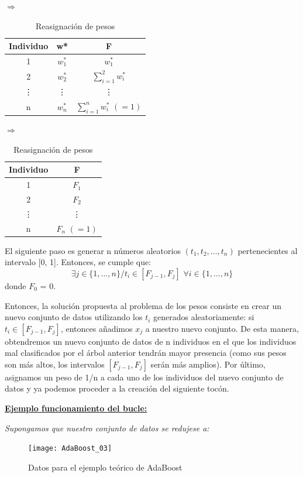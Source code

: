\documentclass[12pt,twoside]{article}
\begin{document}
\begin{table}[h]
\centering
$\Rightarrow$
\begin{tabular}{|c|c|c|}
\hline
Individuo & w* & F\\ \hline
1 & $w_1^*$ & $w_1^*$ \\ \hline
2 & $w_2^*$ & $\displaystyle \sum_{i=1}^2 w_i^*$ \\ \hline
\vdots & \vdots & \vdots \\ \hline
n & $w_n^*$ & $\displaystyle \sum_{i=1}^n w_i^* \, \, (= 1)$ \\ \hline
\end{tabular}
$\Rightarrow$
\begin{tabular}{|c|c|}
\hline
Individuo & F \\ \hline
1 & $F_1$ \\ \hline
2 & $F_2$ \\ \hline
\vdots & \vdots \\ \hline
n & $F_n \, \, (=1)$ \\ \hline
\end{tabular}
\caption{Reasignación de pesos}
\label{tab:AdaB_pesos}
\end{table}

El siguiente paso es generar n números aleatorios $(t_1, t_2, \dots, t_n)$ pertenecientes al intervalo [0, 1]. Entonces, se cumple que:
\begin{equation*}
\exists j \in \{1, \dots, n \} /t_i \in [F_{j-1}, F_{j}] \, \, \forall i \in \{1, \dots, n \}
\end{equation*}
donde $F_0$ = 0.

Entonces, la solución propuesta al problema de los pesos consiste en crear un nuevo conjunto de datos utilizando los $t_i$ generados aleatoriamente: si $t_i \in [F_{j-1}, F_{j}]$, entonces añadimos $x_j$ a nuestro nuevo conjunto. De esta manera, obtendremos un nuevo conjunto de datos de n individuos en el que los individuos mal clasificados por el árbol anterior tendrán mayor presencia (como sus pesos son más altos, los intervalos $[F_{j-1}, F_{j}]$ serán más amplios). Por último, asignamos un peso de 1/n a cada uno de los individuos del nuevo conjunto de datos y ya podemos proceder a la creación del siguiente tocón.


\textbf{\underline{Ejemplo funcionamiento del bucle:}}

\textit{Supongamos que nuestro conjunto de datos se redujese a:}
\begin{figure}[H]
\centering
\texttt{[image: AdaBoost\_03]}
\caption{Datos para el ejemplo teórico de AdaBoost}
\end{figure}
\end{document}
